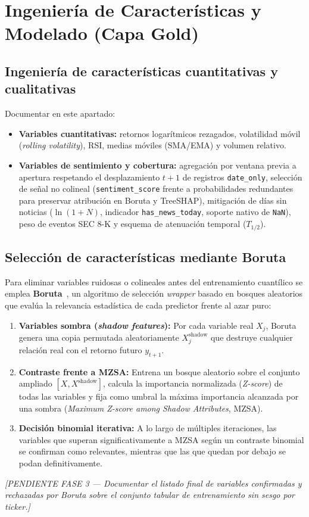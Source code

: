 \chapter{Ingeniería de Características y Modelado (Capa Gold)}

\section{Ingeniería de características cuantitativas y cualitativas}
\begin{cajadestacada}
Documentar en este apartado:
\begin{itemize}
    \item \textbf{Variables cuantitativas:} retornos logarítmicos rezagados, volatilidad móvil (\textit{rolling volatility}), RSI, medias móviles (SMA/EMA) y volumen relativo.
    \item \textbf{Variables de sentimiento y cobertura:} agregación por ventana previa a apertura respetando el desplazamiento $t+1$ de registros \texttt{date\_only}, selección de señal no colineal (\texttt{sentiment\_score} frente a probabilidades redundantes para preservar atribución en Boruta y TreeSHAP), mitigación de días sin noticias ($\ln(1+N)$, indicador \texttt{has\_news\_today}, soporte nativo de \texttt{NaN}), peso de eventos SEC 8-K y esquema de atenuación temporal ($T_{1/2}$).
\end{itemize}
\end{cajadestacada}

\section{Selección de características mediante Boruta}
Para eliminar variables ruidosas o colineales antes del entrenamiento cuantílico se emplea \textbf{Boruta}~\cite{kursa2010boruta}, un algoritmo de selección \textit{wrapper} basado en bosques aleatorios que evalúa la relevancia estadística de cada predictor frente al azar puro:
\begin{enumerate}
    \item \textbf{Variables sombra (\textit{shadow features}):} Por cada variable real $X_j$, Boruta genera una copia permutada aleatoriamente $X_j^{\text{shadow}}$ que destruye cualquier relación real con el retorno futuro $y_{t+1}$.
    \item \textbf{Contraste frente a MZSA:} Entrena un bosque aleatorio sobre el conjunto ampliado $[X, X^{\text{shadow}}]$, calcula la importancia normalizada (\textit{Z-score}) de todas las variables y fija como umbral la máxima importancia alcanzada por una sombra (\textit{Maximum Z-score among Shadow Attributes}, MZSA).
    \item \textbf{Decisión binomial iterativa:} A lo largo de múltiples iteraciones, las variables que superan significativamente a MZSA según un contraste binomial se confirman como relevantes, mientras que las que quedan por debajo se podan definitivamente.
\end{enumerate}
\textit{[PENDIENTE FASE 3 --- Documentar el listado final de variables confirmadas y rechazadas por Boruta sobre el conjunto tabular de entrenamiento sin sesgo por ticker.]}

